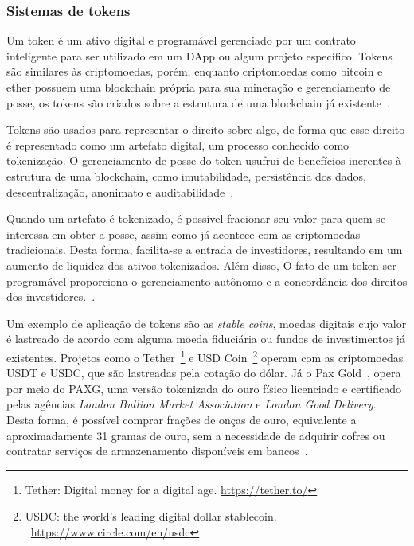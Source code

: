 \subsubsection{Sistemas de tokens} \label{tex:fund:ethereum:app:tokens}

Um token é um ativo digital e programável gerenciado por um contrato inteligente para ser utilizado em um DApp ou algum projeto específico. Tokens são similares às criptomoedas, porém, enquanto criptomoedas como bitcoin e ether possuem uma blockchain própria para sua mineração e gerenciamento de posse, os tokens são criados sobre a estrutura de uma blockchain já existente~\cite{angelo2020tokens}.

Tokens são usados para representar o direito sobre algo, de forma que esse direito é representado como um artefato digital, um processo conhecido como tokenização. O gerenciamento de posse do token usufrui de benefícios inerentes à estrutura de uma blockchain, como imutabilidade, persistência dos dados, descentralização, anonimato e auditabilidade~\cite{angelo2020tokens, monrat2019survey-blockchain-ieee}. 

Quando um artefato é tokenizado, é possível fracionar seu valor para quem se interessa em obter a posse, assim como já acontece com as criptomoedas tradicionais. Desta forma, facilita-se a entrada de investidores, resultando em um aumento de liquidez dos ativos tokenizados. Além disso, O fato de um token ser programável proporciona o gerenciamento autônomo e a concordância dos direitos dos investidores.~\cite{angelo2020tokens}.

Um exemplo de aplicação de tokens são as \textit{stable coins}, moedas digitais cujo valor é lastreado de acordo com alguma moeda fiduciária ou fundos de investimentos já existentes. Projetos como o Tether~\footnote{Tether: Digital money for a digital age. \url{https://tether.to/}} e USD Coin~\footnote{USDC: the world's leading digital dollar stablecoin. ~\url{https://www.circle.com/en/usdc}} operam com as criptomoedas USDT e USDC, que são lastreadas pela cotação do dólar. Já o Pax Gold~\cite{paxgold-whitepaper}, opera por meio do  PAXG, uma versão tokenizada do ouro físico licenciado e certificado pelas agências \textit{London Bullion Market
Association} e   \textit{London Good Delivery}. Desta forma, é possível comprar frações de onças de ouro, equivalente a aproximadamente 31 gramas de ouro, sem a necessidade de adquirir cofres ou contratar serviços de armazenamento disponíveis em bancos~\cite{paxgold-whitepaper}. 

